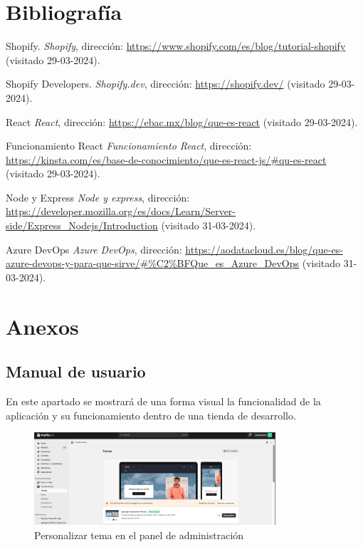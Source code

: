 \documentclass[12pt]{article}
\begin{document}
\section{Bibliografía}
\renewcommand{\refname}{}
\begin{thebibliography}{100} %
    
    Shopify. 
    \textit{Shopify}, dirección: \url{https://www.shopify.com/es/blog/tutorial-shopify} (visitado 29-03-2024).

    Shopify Developers. 
    \textit{Shopify.dev}, dirección: \url{https://shopify.dev/} (visitado 29-03-2024).

    React
    \textit{React}, dirección: \url{https://ebac.mx/blog/que-es-react} (visitado 29-03-2024).

    Funcionamiento React
    \textit{Funcionamiento React}, dirección: \url{https://kinsta.com/es/base-de-conocimiento/que-es-react-js/#qu-es-react} (visitado 29-03-2024).

    Node y Express
    \textit{Node y express}, dirección: \url{https://developer.mozilla.org/es/docs/Learn/Server-side/Express_Nodejs/Introduction} (visitado 31-03-2024).

    Azure DevOps
    \textit{Azure DevOps}, dirección: \url{https://aodatacloud.es/blog/que-es-azure-devops-y-para-que-sirve/#%C2%BFQue_es_Azure_DevOps} (visitado 31-03-2024).

\end{thebibliography}

\section{Anexos}

\subsection{Manual de usuario}
En este apartado se mostrará de una forma visual la funcionalidad de la aplicación y su funcionamiento dentro de una tienda de desarrollo.

\begin{figure}[ht]
    \centering
    \includegraphics[width=0.8\textwidth]{imagenes/ManualUsuario/PantallaDePersonalizarTema.png}
    \caption{\label{fig:PersonalizarTema}Personalizar tema en el panel de administración}
    \vspace{\fill}
\end{figure}
\end{document}
